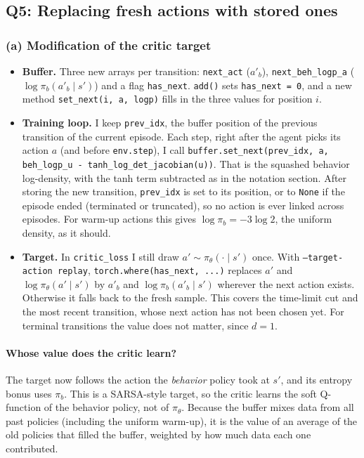\documentclass[11pt]{article}
\newcommand{\code}[1]{\texttt{#1}}
\begin{document}
\subsection*{Q5: Replacing fresh actions with stored ones}

\subsubsection*{(a) Modification of the critic target}
\begin{itemize}
  \item \textbf{Buffer.} Three new arrays per transition: \code{next\_act} ($a'_b$),
        \code{next\_beh\_logp\_a} ($\log\pi_b(a'_b\mid s')$) and a flag \code{has\_next}. \code{add()} sets
        \code{has\_next = 0}, and a new method \code{set\_next(i, a, logp)} fills in the three values for position $i$.
  \item \textbf{Training loop.} I keep \code{prev\_idx}, the buffer position of the previous transition of
        the current episode. Each step, right after the agent picks its action $a$ (and before
        \code{env.step}), I call \code{buffer.set\_next(prev\_idx, a, beh\_logp\_u - tanh\_log\_det\_jacobian(u))}.
        That is the squashed behavior log-density, with the tanh term subtracted as in the
        notation section. After storing the new transition, \code{prev\_idx} is set to its position, or to
        \code{None} if the episode ended (terminated or truncated), so no action is ever linked across episodes.
        For warm-up actions this gives $\log\pi_b=-3\log2$, the uniform density, as it should.
  \item \textbf{Target.} In \code{critic\_loss} I still draw $a'\sim\pi_\theta(\cdot\mid s')$ once. With
        \code{--target-action replay}, \code{torch.where(has\_next, ...)} replaces $a'$ and
        $\log\pi_\theta(a'\mid s')$ by $a'_b$ and $\log\pi_b(a'_b\mid s')$ wherever the next action exists.
        Otherwise it falls back to the fresh sample. This covers the time-limit cut and the
        most recent transition, whose next action has not been chosen yet. For terminal transitions the
        value does not matter, since $d=1$.
\end{itemize}

\paragraph{Whose value does the critic learn?}
The target now follows the action the \emph{behavior} policy took at $s'$, and its entropy bonus
uses $\pi_b$. This is a SARSA-style target, so the critic learns the soft Q-function of the behavior policy, not of $\pi_\theta$. Because the
buffer mixes data from all past policies (including the uniform warm-up), it is the value of an average of
the old policies that filled the buffer, weighted by how much data each one contributed.
\end{document}
